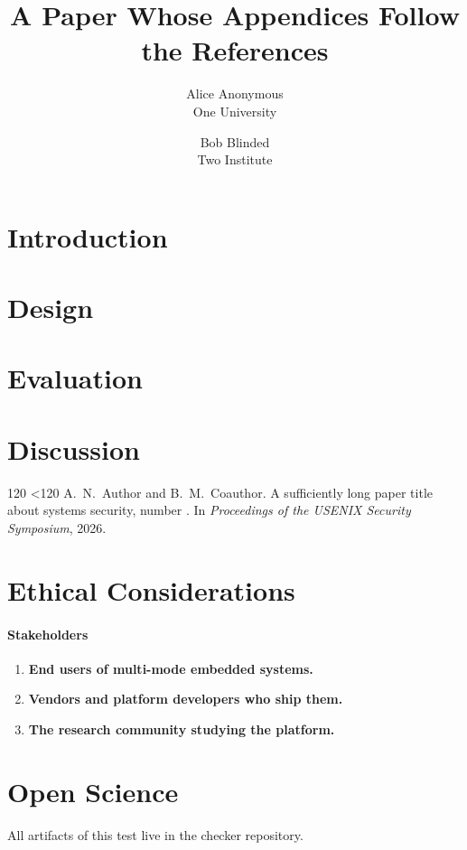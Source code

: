 \documentclass[letterpaper,twocolumn,10pt]{article}
\date{}
\title{\Large \bf A Paper Whose Appendices Follow the References}
\author{{\rm Alice Anonymous}\\One University \and {\rm Bob Blinded}\\Two Institute}
\begin{document}
\maketitle

\begin{abstract}
\lipsum[1][1-5]
\end{abstract}

\section{Introduction}
\lipsum[1-30]

\section{Design}
\lipsum[31-60]

\section{Evaluation}
\lipsum[61-90]

\section{Discussion}
\lipsum[91-120]

\clearpage
\begin{thebibliography}{120}
\loop\ifnum\value{ref}<120 
   A.~N.\ Author and B.~M.\ Coauthor. A sufficiently long
  paper title about systems security, number \theref. In \emph{Proceedings of
  the USENIX Security Symposium}, 2026.
\repeat
\end{thebibliography}

\appendix
\section*{Ethical Considerations}

\paragraph{Stakeholders}
\begin{enumerate}
  \item \textbf{End users of multi-mode embedded systems.} \lipsum[1][1-3]
  \item \textbf{Vendors and platform developers who ship them.} \lipsum[2][1-3]
  \item \textbf{The research community studying the platform.} \lipsum[3][1-3]
\end{enumerate}

\section*{Open Science}
All artifacts of this test live in the checker repository.
\end{document}
